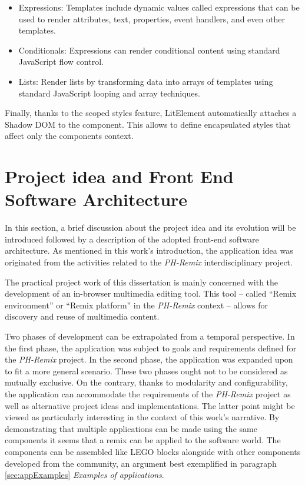 \begin{itemize}
\item Expressions: Templates include dynamic values called expressions that can be used to render attributes, text, properties, event handlers, and even other templates.
\item Conditionals: Expressions can render conditional content using standard JavaScript flow control.
\item Lists: Render lists by transforming data into arrays of templates using standard JavaScript looping and array techniques.
\end{itemize}

Finally, thanks to the scoped styles feature, LitElement automatically attaches a Shadow DOM to the component. This allows to define encapsulated styles that affect only the components context.

\section{Project idea and Front End Software Architecture}
\label{sec:SoftwareArchitecture}

In this section, a brief discussion about the project idea and its evolution will be introduced followed by a description of the adopted front-end software architecture. As mentioned in this work’s introduction, the application idea was originated from the activities related to the \emph{PH-Remix} interdisciplinary project.

The practical project work of this dissertation is mainly concerned with the development of an in-browser multimedia editing tool. This tool – called “Remix environment” or “Remix platform” in the \emph{PH-Remix} context – allows for discovery and reuse of multimedia content.

Two phases of development can be extrapolated from a temporal perspective. In the first phase, the application was subject to goals and requirements defined for the \emph{PH-Remix} project. In the second phase, the application was expanded upon to fit a more general scenario. These two phases ought not to be considered as mutually exclusive. On the contrary, thanks to modularity and configurability, the application can accommodate the requirements of the \emph{PH-Remix} project as well as alternative project ideas and implementations. The latter point might be viewed as particularly interesting in the context of this work’s narrative. By demonstrating that multiple applications can be made using the same components it seems that a remix can be applied to the software world. The components can be assembled like LEGO blocks alongside with other components developed from the community, an argument best exemplified in paragraph \ref{sec:appExamples} \emph{Examples of applications}.

